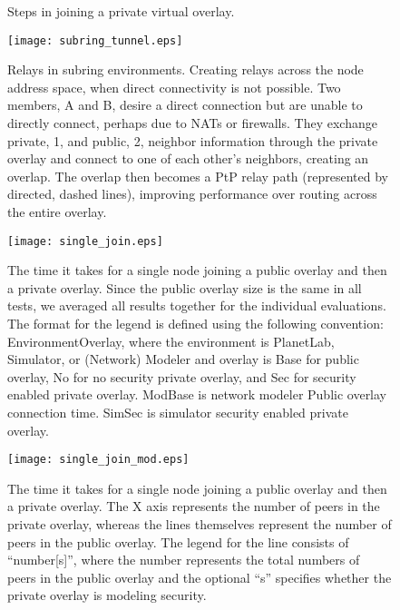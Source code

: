 \begin{figure}[ht]
\centering
\caption{Steps in joining a private virtual overlay.}
\label{fig:private_overlay_states}
\end{figure}


\begin{figure}[ht]
\centering
\texttt{[image: subring\_tunnel.eps]}
\caption[Relays in subring environments.]{Relays in subring environments.
Creating relays across the node address space, when direct connectivity is not
possible.  Two members, A and B, desire a direct connection but are unable to
directly connect, perhaps due to NATs or firewalls.  They exchange private, 1,
and public, 2, neighbor information through the private overlay and connect to
one of each other's neighbors, creating an overlap.  The overlap then becomes a
PtP relay path (represented by directed, dashed lines), improving performance
over routing across the entire overlay.}
\label{fig:overlay_relay}
\end{figure}

\begin{figure}[ht]
\centering
\texttt{[image: single\_join.eps]}
\caption[Time taken by a single node to join public and private overlays.]{The
time it takes for a single node joining a public overlay and then a private
overlay. Since the public overlay size is the same in all tests, we averaged
all results together for the individual evaluations.  The format for the
legend is defined using the following convention: EnvironmentOverlay, where the
environment is PlanetLab, Simulator, or (Network) Modeler and overlay is Base
for public overlay, No for no security private overlay, and Sec for security
enabled private overlay. ModBase is network modeler Public overlay connection
time.  SimSec is simulator security enabled private overlay.}
\label{fig:single_join}
\end{figure}

\begin{figure}[ht]
\centering
\texttt{[image: single\_join\_mod.eps]}
\caption[Time taken by a single node to join large public and private
overlays.]{The time it takes for a single node joining a public
overlay and then a private overlay. The X axis represents the number of peers
in the private overlay, whereas the lines themselves represent the number of
peers in the public overlay.  The legend for the line consists of
``number[s]'', where the number represents the total numbers of peers in the
public overlay and the optional ``s'' specifies whether the private overlay is
modeling security.}
\label{fig:single_join_mod}
\end{figure}


